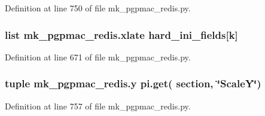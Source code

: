 Definition at line 750 of file mk\-\_\-pgpmac\-\_\-redis.\-py.

\hypertarget{namespacemk__pgpmac__redis_afba647feb8fc4d0a364c3dca29af3a22}{
\subsubsection[{xlate}]{\setlength{\rightskip}{0pt plus 5cm}list mk\-\_\-pgpmac\-\_\-redis.\-xlate {\bf hard\-\_\-ini\-\_\-fields}\mbox{[}k\mbox{]}}}\label{namespacemk__pgpmac__redis_afba647feb8fc4d0a364c3dca29af3a22}


Definition at line 671 of file mk\-\_\-pgpmac\-\_\-redis.\-py.

\hypertarget{namespacemk__pgpmac__redis_a34220d58136fb95853f54ed51a130f79}{
\subsubsection[{y}]{\setlength{\rightskip}{0pt plus 5cm}tuple mk\-\_\-pgpmac\-\_\-redis.\-y pi.\-get( section, \char`\"{}Scale\-Y\char`\"{})}}\label{namespacemk__pgpmac__redis_a34220d58136fb95853f54ed51a130f79}


Definition at line 757 of file mk\-\_\-pgpmac\-\_\-redis.\-py.

